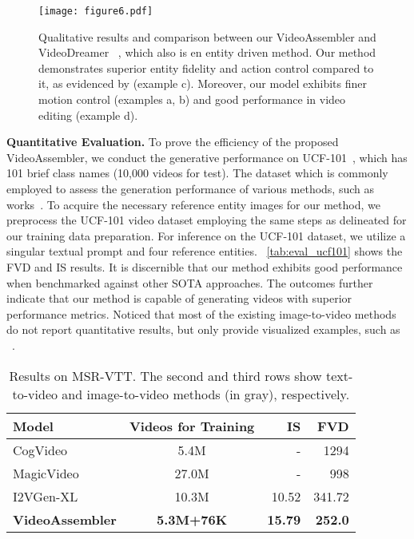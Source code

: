 \begin{figure*}[ht]
\centering
\texttt{[image: figure6.pdf]}
\caption{Qualitative results and comparison between our VideoAssembler and VideoDreamer ~\cite{chen2023videodreamer}, which also is en entity driven method. Our method demonstrates superior entity fidelity and action control compared to it, as evidenced by (example c). Moreover, our model exhibits finer motion control (examples a, b) and good performance in video editing (example d).}
\label{fig: qualitative results}
\end{figure*}

\noindent
\textbf{Quantitative Evaluation.}
To prove the efficiency of the proposed VideoAssembler, we conduct the generative performance on UCF-101~\cite{soomro2012ucf101}, which has 101 brief class names (10,000 videos for test). The dataset which is commonly employed to assess the generation performance of various methods, such as works~\cite{singer2022make, hong2023cogvideo, wang2023videofactory}. To acquire the necessary reference entity images for our method, we preprocess the UCF-101 video dataset employing the same steps as delineated for our training data preparation. For inference on the UCF-101 dataset, we utilize a singular textual prompt and four reference entities. ~\cref{tab:eval_ucf101} shows the FVD and IS results. It is discernible that our method exhibits good performance when benchmarked against other SOTA approaches. The outcomes further indicate that our method is capable of generating videos with superior performance metrics. Noticed that most of the existing image-to-video methods do not report quantitative results, but only provide visualized examples, such as ~\cite{molad2023dreamix, chen2023videocrafter}.

\begin{table}[ht]
    \setlength{\tabcolsep}{1.5mm}
    \centering
    \begin{tabular}{lcrr}
       \toprule
       Model & Videos for Training & IS  & FVD  \\
       \midrule
       CogVideo~\cite{hong2023cogvideo} & 5.4M & - & 1294 \\
       MagicVideo~\cite{zhou2022magicvideo} & 27.0M & - & 998 \\
       \midrule
       \rowcolor{gray!20}
       \rowcolor{gray!20}
       I2VGen-XL~\cite{zhang2023i2vgen-xl} & 10.3M & 10.52 & 341.72 \\
       \midrule
       \textbf{VideoAssembler} & \textbf{5.3M+76K} & \textbf{15.79} & \textbf{252.0} \\
       \bottomrule
    \end{tabular}
    \caption{Results on MSR-VTT. The second and third rows show text-to-video and image-to-video methods (in gray), respectively.}
    \label{tab:eval_msrvtt}
\end{table}


